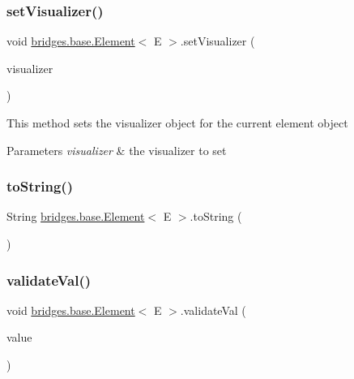 \subsubsection{\texorpdfstring{set\+Visualizer()}{setVisualizer()}}
{\footnotesize\ttfamily void \mbox{\hyperlink{classbridges_1_1base_1_1_element}{bridges.\+base.\+Element}}$<$ E $>$.set\+Visualizer (\begin{DoxyParamCaption}\item[{\mbox{\hyperlink{classbridges_1_1base_1_1_element_visualizer}{Element\+Visualizer}}}]{visualizer }\end{DoxyParamCaption})}

This method sets the visualizer object for the current element object


\begin{DoxyParams}{Parameters}
{\em visualizer} & the visualizer to set \\
\hline
\end{DoxyParams}
\mbox{\label{classbridges_1_1base_1_1_element_a7dc685e317fd9dc2e73e049a9f907e42}} 
\subsubsection{\texorpdfstring{to\+String()}{toString()}}
{\footnotesize\ttfamily String \mbox{\hyperlink{classbridges_1_1base_1_1_element}{bridges.\+base.\+Element}}$<$ E $>$.to\+String (\begin{DoxyParamCaption}{ }\end{DoxyParamCaption})}

\mbox{\label{classbridges_1_1base_1_1_element_af1a60f4e6a91d379179f7d56e6dc3829}} 
\subsubsection{\texorpdfstring{validate\+Val()}{validateVal()}}
{\footnotesize\ttfamily void \mbox{\hyperlink{classbridges_1_1base_1_1_element}{bridges.\+base.\+Element}}$<$ E $>$.validate\+Val (\begin{DoxyParamCaption}\item[{E}]{value }\end{DoxyParamCaption})\hspace{0.3cm}{\ttfamily [protected]}}

